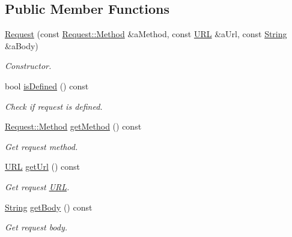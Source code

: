 \subsection*{Public Member Functions}
\begin{DoxyCompactItemize}
\item 
\hyperlink{classlibrary_1_1io_1_1ip_1_1tcp_1_1http_1_1_request_ab388f80fccab4d282f30afa08ffa0217}{Request} (const \hyperlink{classlibrary_1_1io_1_1ip_1_1tcp_1_1http_1_1_request_a45baccf3aec384fbdbbf6ce411f11bd7}{Request\+::\+Method} \&a\+Method, const \hyperlink{classlibrary_1_1io_1_1_u_r_l}{U\+RL} \&a\+Url, const \hyperlink{namespacelibrary_1_1io_1_1ip_1_1tcp_1_1http_a1c435ea1e3614d52139da88a36632815}{String} \&a\+Body)
\begin{DoxyCompactList}\small\item\em Constructor. \end{DoxyCompactList}\item 
bool \hyperlink{classlibrary_1_1io_1_1ip_1_1tcp_1_1http_1_1_request_a66bbb39defc2952c2c3afb83f192e0e8}{is\+Defined} () const
\begin{DoxyCompactList}\small\item\em Check if request is defined. \end{DoxyCompactList}\item 
\hyperlink{classlibrary_1_1io_1_1ip_1_1tcp_1_1http_1_1_request_a45baccf3aec384fbdbbf6ce411f11bd7}{Request\+::\+Method} \hyperlink{classlibrary_1_1io_1_1ip_1_1tcp_1_1http_1_1_request_a330afb31317aeb20e0973c143f49ef8a}{get\+Method} () const
\begin{DoxyCompactList}\small\item\em Get request method. \end{DoxyCompactList}\item 
\hyperlink{classlibrary_1_1io_1_1_u_r_l}{U\+RL} \hyperlink{classlibrary_1_1io_1_1ip_1_1tcp_1_1http_1_1_request_a77856e25f50a6e186e45a8650cc971aa}{get\+Url} () const
\begin{DoxyCompactList}\small\item\em Get request \hyperlink{classlibrary_1_1io_1_1_u_r_l}{U\+RL}. \end{DoxyCompactList}\item 
\hyperlink{namespacelibrary_1_1io_1_1ip_1_1tcp_1_1http_a1c435ea1e3614d52139da88a36632815}{String} \hyperlink{classlibrary_1_1io_1_1ip_1_1tcp_1_1http_1_1_request_a7a4aa551e792113f238a3782ec15bceb}{get\+Body} () const
\begin{DoxyCompactList}\small\item\em Get request body. \end{DoxyCompactList}\end{DoxyCompactItemize}
